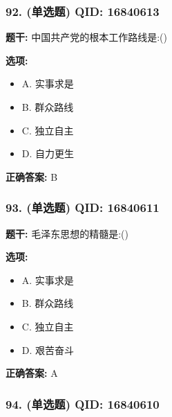 \documentclass[12pt,UTF8]{ctexart}
\begin{document}
\subsubsection*{92. (单选题) \small QID: 16840613}

\textbf{题干:}
中国共产党的根本工作路线是:()

\textbf{选项:}
\begin{itemize}[leftmargin=*]

  \item A. 实事求是

  \item B. 群众路线

  \item C. 独立自主

  \item D. 自力更生

\end{itemize}

\textbf{正确答案:}
B

\vspace{0.3em}\hrulefill\vspace{0.7em}

\subsubsection*{93. (单选题) \small QID: 16840611}

\textbf{题干:}
毛泽东思想的精髓是:()

\textbf{选项:}
\begin{itemize}[leftmargin=*]

  \item A. 实事求是

  \item B. 群众路线

  \item C. 独立自主

  \item D. 艰苦奋斗

\end{itemize}

\textbf{正确答案:}
A

\vspace{0.3em}\hrulefill\vspace{0.7em}

\subsubsection*{94. (单选题) \small QID: 16840610}
\end{document}
